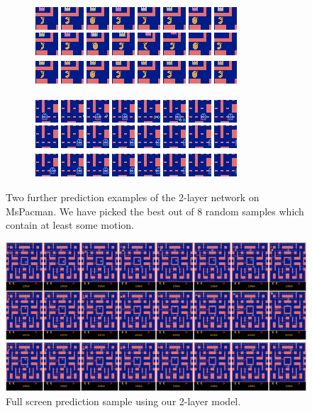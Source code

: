 \begin{figure}[h!tb]
\centering
\begin{subfigure}{0.49\textwidth}
  \centering
  \includegraphics[width=0.92\linewidth]{figures/pred/pac/random/pred-01.png}
  \caption{}
  \label{fig:pac-pred-random_extra1}
\end{subfigure}%
\begin{subfigure}{0.49\textwidth}
  \centering
  \includegraphics[width=0.92\linewidth]{figures/pred/pac/random/pred-02.png}
  \caption{}
  \label{fig:pac-pred-random_extra2}
\end{subfigure}
\caption[Prediction Samples on MsPacman]{Two further prediction examples of the 2-layer network on MsPacman. We have picked the best out of 8 random samples which contain at least some motion.} \label{fig:pac-pred-random_extra}
\end{figure}

\begin{figure}[htpb]
	\centering
	\includegraphics[width=1.0\linewidth]{figures/pred/pac/full/pred-01.png} 
	\caption[Full Screen Prediction on MsPacman]{Full screen prediction sample using our 2-layer model.} \label{fig:pac-pred-full2}
\end{figure}

